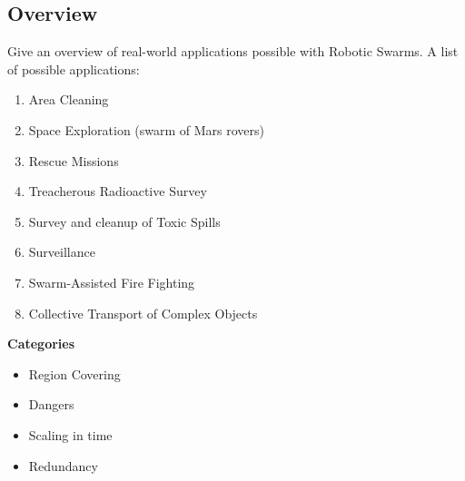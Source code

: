   \subsection{Overview}
  Give an overview of real-world applications possible with Robotic Swarms. A list of possible applications:
    \begin{enumerate}
      \item Area Cleaning
      \item Space Exploration (swarm of Mars rovers)
      \item Rescue Missions
      \item Treacherous Radioactive Survey
      \item Survey and cleanup of Toxic Spills
      \item Surveillance
      \item Swarm-Assisted Fire Fighting
     \item Collective Transport of Complex Objects
    \end{enumerate}
  \textbf{Categories}
    \begin{itemize}
      \item Region Covering
      \item Dangers
      \item Scaling in time
      \item Redundancy
    \end{itemize}
  